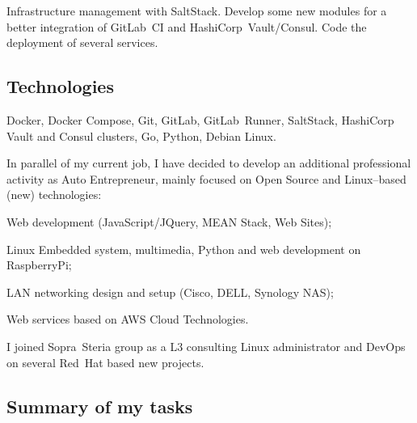 \vskip 0pt\noindent
Infrastructure management with SaltStack.
Develop some new modules for a better integration of GitLab~CI and
HashiCorp~Vault/Consul. Code the deployment of several services.

\subsection{Technologies}

\vskip 0pt\noindent
Docker, Docker Compose, Git, GitLab, GitLab~Runner, SaltStack,
HashiCorp Vault and Consul clusters, Go, Python, Debian Linux.



In parallel of my current job, I have decided to develop an additional professional
activity as Auto Entrepreneur, mainly focused on Open Source and Linux--based (new) technologies:

\item{\bdot} Web development (JavaScript/JQuery, MEAN Stack, Web Sites);
\item{\bdot} Linux Embedded system, multimedia, Python and web development on RaspberryPi;
\item{\bdot} LAN networking design and setup (Cisco, DELL, Synology NAS);
\item{\bdot} Web services based on AWS Cloud Technologies.



I joined Sopra~Steria group as a L3 consulting Linux administrator and DevOps on
several Red~Hat based new projects.

\subsection{Summary of my tasks}

